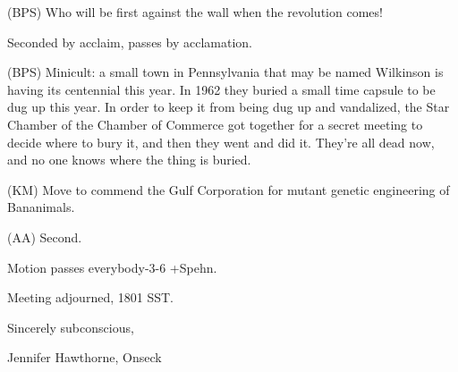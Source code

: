 \documentclass[12pt]{article}
\begin{document}
(BPS) Who will be first against the wall when the revolution comes!

Seconded by acclaim, passes by acclamation.

(BPS) Minicult: a small town in Pennsylvania that may be named Wilkinson is having its centennial this year. In 1962 they buried a small time capsule to be dug up this year. In order to keep it from being dug up and vandalized, the Star Chamber of the Chamber of Commerce got together for a secret meeting to decide where to bury it, and then they went and did it. They're all dead now, and no one knows where the thing is buried.

(KM) Move to commend the Gulf Corporation for mutant genetic engineering of Bananimals.

(AA) Second.

Motion passes everybody-3-6 +Spehn.

\vspace{12pt}

\noindent
Meeting adjourned, 1801 SST.

\vspace{18pt}

\centerline{Sincerely subconscious,}
\centerline{Jennifer Hawthorne, Onseck}
\end{document}
